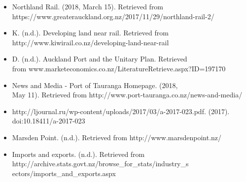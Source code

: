 \begin{itemize}[noitemsep]
    \item Northland Rail. (2018, March 15). Retrieved from \\https://www.greaterauckland.org.nz/2017/11/29/northland-rail-2/
    \item K. (n.d.). Developing land near rail. Retrieved from http://www.kiwirail.co.nz/developing-land-near-rail
    \item D. (n.d.). Auckland Port and the Unitary Plan. Retrieved \\from www.marketeconomics.co.nz/LiteratureRetrieve.aspx?ID=197170
    \item News and Media - Port of Tauranga Homepage. (2018, \\May 11). Retrieved from http://www.port-tauranga.co.nz/news-and-media/
    \item http://ljournal.ru/wp-content/uploads/2017/03/a-2017-023.pdf. (2017). doi:10.18411/a-2017-023
    \item Marsden Point. (n.d.). Retrieved from http://www.marsdenpoint.nz/
    \item Imports and exports. (n.d.). Retrieved from http://archive.stats.govt.nz/browse\_for\_stats/industry\_s\\ectors/imports\_and\_exports.aspx


\end{itemize}

\clearpage